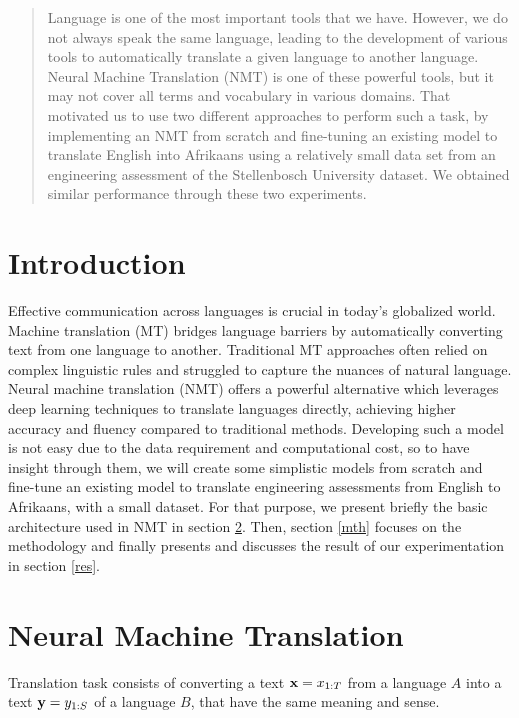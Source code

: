 \begin{abstract}
	Language is one of the most important tools that we have. However, we do not always speak the same language, leading to the development of various tools to automatically translate a given language to another language. Neural Machine Translation (NMT) is one of these powerful tools, but it may not cover all terms and vocabulary in various domains. That motivated us to use two different approaches to perform such a task, by implementing an NMT from scratch and fine-tuning an existing model to translate English into Afrikaans using a relatively small data set from an engineering assessment of the Stellenbosch University dataset. We obtained similar performance through these two experiments.
\end{abstract}

\section{Introduction}
Effective communication across languages is crucial in today's globalized world. Machine translation (MT) bridges language barriers by automatically converting text from one language to another. Traditional MT approaches often relied on complex linguistic rules and struggled to capture the nuances of natural language. Neural machine translation (NMT) offers a powerful alternative which leverages deep learning techniques to translate languages directly, achieving higher accuracy and fluency compared to traditional methods. Developing such a model is not easy due to the data requirement and computational cost, so to have insight through them, we will create some simplistic models from scratch and fine-tune an existing model to translate engineering assessments from English to Afrikaans, with a small dataset. For that purpose, we present briefly the basic architecture used in NMT in section \ref{nmt}.  Then, section \ref{mth} focuses on the methodology and finally presents and discusses the result of our experimentation in section \ref{res}.

\section{Neural Machine Translation}\label{nmt}
Translation task consists of converting a text $\mathbf{x}=x_{1:T}$ from a language $A$ into a text $\mathbf{y}=y_{1:S}$ of a language $B$, that have the same meaning and sense.

